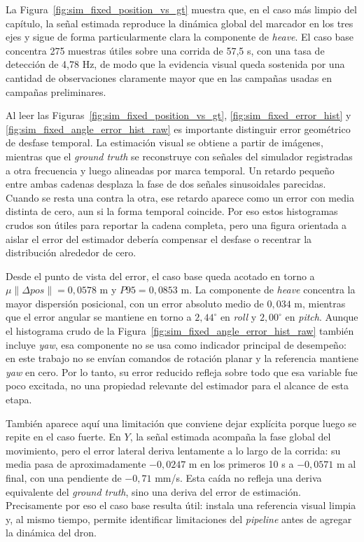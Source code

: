 \documentclass[12pt,a4paper]{report}
\begin{document}
La Figura~\ref{fig:sim_fixed_position_vs_gt} muestra que, en el caso más limpio
del capítulo, la señal estimada reproduce la dinámica global del marcador en
los tres ejes y sigue de forma particularmente clara la componente de \emph{heave}. El
caso base concentra 275 muestras útiles sobre una corrida de 57,5 s, con una
tasa de detección de 4,78 Hz, de modo que la evidencia visual queda sostenida
por una cantidad de observaciones claramente mayor que en las campañas usadas
en campañas preliminares.

Al leer las Figuras~\ref{fig:sim_fixed_position_vs_gt},
\ref{fig:sim_fixed_error_hist} y \ref{fig:sim_fixed_angle_error_hist_raw} es
importante distinguir error geométrico de desfase temporal. La estimación visual
se obtiene a partir de imágenes, mientras que el \textit{ground truth} se reconstruye con
señales del simulador registradas a otra frecuencia y luego alineadas por marca
temporal. Un retardo pequeño entre ambas cadenas desplaza la fase de dos señales
sinusoidales parecidas. Cuando se resta una contra la otra, ese retardo aparece
como un error con media distinta de cero, aun si la forma temporal coincide. Por
eso estos histogramas crudos son útiles para reportar la cadena completa, pero
una figura orientada a aislar el error del estimador debería compensar el
desfase o recentrar la distribución alrededor de cero.

Desde el punto de vista del error, el caso base queda acotado en torno a
\(\mu\|\Delta pos\| = 0{,}0578\) m y \(P95 = 0{,}0853\) m. La componente de
\emph{heave} concentra la mayor dispersión posicional, con un error absoluto medio de
\(0{,}034\) m, mientras que el error angular se mantiene en torno a
\(2{,}44^\circ\) en \emph{roll} y \(2{,}00^\circ\) en \emph{pitch}. Aunque el histograma crudo
de la Figura~\ref{fig:sim_fixed_angle_error_hist_raw} también incluye \emph{yaw}, esa
componente no se usa como indicador principal de desempeño: en este trabajo no
se envían comandos de rotación planar y la referencia mantiene \emph{yaw} en cero. Por
lo tanto, su error reducido refleja sobre todo que esa variable fue poco
excitada, no una propiedad relevante del estimador para el alcance de esta
etapa.

También aparece aquí una limitación que conviene dejar explícita porque luego se
repite en el caso fuerte. En \(Y\), la señal estimada acompaña la fase global
del movimiento, pero el error lateral deriva lentamente a lo largo de la
corrida: su media pasa de aproximadamente \(-0{,}0247\) m en los primeros
10 s a \(-0{,}0571\) m al final, con una pendiente de
\(-0{,}71\) mm/s. Esta caída no refleja una deriva equivalente del \textit{ground truth},
sino una deriva del error de estimación. Precisamente por eso el caso base
resulta útil: instala una referencia visual limpia y, al mismo tiempo, permite
identificar limitaciones del \textit{pipeline} antes de agregar la dinámica del dron.
\end{document}
